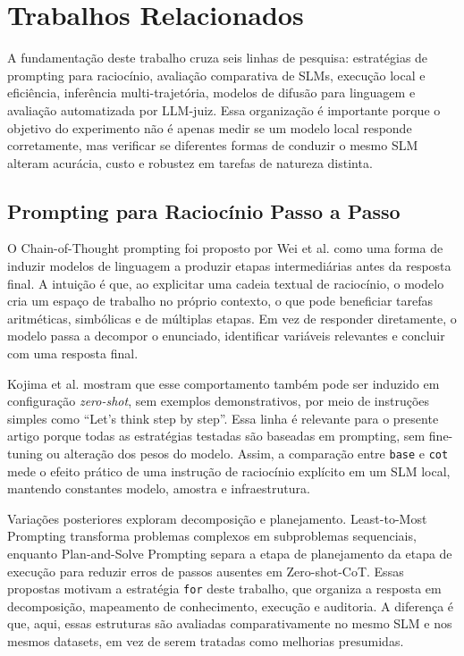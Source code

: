 \documentclass[12pt]{article}
\begin{document}
\section{Trabalhos Relacionados}

A fundamentação deste trabalho cruza seis linhas de pesquisa: estratégias de prompting para raciocínio, avaliação comparativa de SLMs, execução local e eficiência, inferência multi-trajetória, modelos de difusão para linguagem e avaliação automatizada por LLM-juiz. Essa organização é importante porque o objetivo do experimento não é apenas medir se um modelo local responde corretamente, mas verificar se diferentes formas de conduzir o mesmo SLM alteram acurácia, custo e robustez em tarefas de natureza distinta.

\subsection{Prompting para Raciocínio Passo a Passo}

O Chain-of-Thought prompting foi proposto por Wei et al. \cite{wei2022} como uma forma de induzir modelos de linguagem a produzir etapas intermediárias antes da resposta final. A intuição é que, ao explicitar uma cadeia textual de raciocínio, o modelo cria um espaço de trabalho no próprio contexto, o que pode beneficiar tarefas aritméticas, simbólicas e de múltiplas etapas. Em vez de responder diretamente, o modelo passa a decompor o enunciado, identificar variáveis relevantes e concluir com uma resposta final.

Kojima et al. \cite{kojima2022} mostram que esse comportamento também pode ser induzido em configuração \textit{zero-shot}, sem exemplos demonstrativos, por meio de instruções simples como ``Let's think step by step''. Essa linha é relevante para o presente artigo porque todas as estratégias testadas são baseadas em prompting, sem fine-tuning ou alteração dos pesos do modelo. Assim, a comparação entre \texttt{base} e \texttt{cot} mede o efeito prático de uma instrução de raciocínio explícito em um SLM local, mantendo constantes modelo, amostra e infraestrutura.

Variações posteriores exploram decomposição e planejamento. Least-to-Most Prompting \cite{zhou2023} transforma problemas complexos em subproblemas sequenciais, enquanto Plan-and-Solve Prompting \cite{wang2023plansolve} separa a etapa de planejamento da etapa de execução para reduzir erros de passos ausentes em Zero-shot-CoT. Essas propostas motivam a estratégia \texttt{for} deste trabalho, que organiza a resposta em decomposição, mapeamento de conhecimento, execução e auditoria. A diferença é que, aqui, essas estruturas são avaliadas comparativamente no mesmo SLM e nos mesmos datasets, em vez de serem tratadas como melhorias presumidas.
\end{document}

